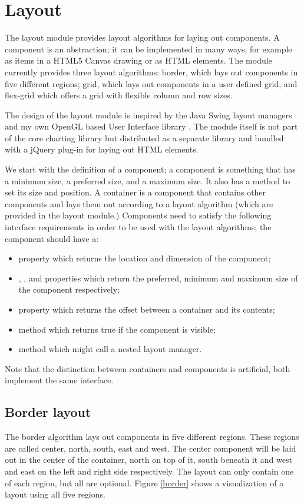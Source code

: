 \section{Layout}
The layout module provides layout algorithms for laying out components. A component is an abstraction; it can be implemented in many ways, for example as items in a HTML5 Canvas drawing or as HTML elements. The module currently provides three layout algorithms: border, which lays out components in five different regions; grid, which lays out components in a user defined grid, and flex-grid which offers a grid with flexible column and row sizes.

The design of the layout module is inspired by the Java Swing layout managers \cite{sun08} and my own OpenGL based User Interface library \cite{stein06}. The module itself is not part of the core charting library but distributed as a separate library \cite{stein08} and bundled with a jQuery plug-in for laying out HTML elements.

We start with the definition of a component; a component is something that has a minimum size, a preferred size, and a maximum size. It also has a method to set its size and position. A container is a component that contains other components and lays them out according to a layout algorithm (which are provided in the layout module.) Components need to satisfy the following interface requirements in order to be used with the layout algorithms; the component should have a:
\begin{itemize}
\item {} property which returns the location and dimension of the component;
\item {}, , and  properties which return the preferred, minimum and maximum size of the component respectively;
\item {} property which returns the offset between a container and its contents;
\item {} method which returns true if the component is visible;
\item {} method which might call a nested layout manager.
\end{itemize}

Note that the distinction between containers and components is artificial, both implement the same interface. 

\subsection{Border layout}
The border algorithm lays out components in five different regions. These regions are called center, north, south, east and west. The center component will be laid out in the center of the container, north on top of it, south beneath it and west and east on the left and right side respectively. The layout can only contain one of each region, but all are optional. Figure \ref{border} shows a visualization of a layout using all five regions. 


